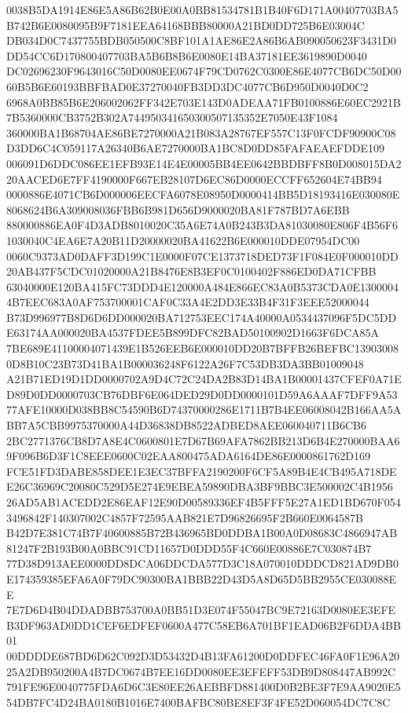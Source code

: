 \documentclass[UTF8,fontset=fandol,zihao=-4,a4paper]{ctexart}
\begin{document}
{{0038B5DA1914E86E5A86B62B0E00A0BB81534781B1B40F6D171A00407703BA5B742B6E0080095B9F7181EEA64168BBB80000A21BD0DD725B6E03004C
DB034D0C7437755BDB050500C8BF101A1AE86E2A86B6AB090050623F3431D0DD54CC6D170800407703BA5B6B8B6E0080E14BA37181EE3619890D0040
DC02696230F9643016C50D0080EE0674F79CD0762C0300E86E4077CB6DC50D0060B5B6E60193BBFBAD0E37270040FB3DD3DC4077CB6D950D0040D0C2
6968A0BB85B6E206002062FF342E703E143D0ADEAA71FB0100886E60EC2921B7B5360000CB3752B302A744950341650300507135352E7050E43F1084
360000BA1B68704AE86BE7270000A21B083A28767EF557C13F0FCDF90900C08D3DD6C4C059117A26340B6AE7270000BA1BC8D0DD85FAFAEAEFDDE109
006091D6DDC086EE1EFB93E14E4E00005BB4EE0642BBDBFF8B0D008015DA220AACED6E7FF4190000F667EB28107D6EC86D0000ECCFF652604E74BB94
0000886E4071CB6D000006EECFA6078E08950D0000414BB5D18193416E030080E8068624B6A309008036FBB6B981D656D9000020BA81F787BD7A6EBB
880000886EA0F4D3ADB8010020C35A6E74A0B243B3DA81030080E806F4B56F61030040C4EA6E7A20B11D20000020BA41622B6E000010DDE07954DC00
0060C9373AD0DAFF3D199C1E0000F07CE1373718DED73F1F084E0F000010DD20AB437F5CDC01020000A21B8476E8B3EF0C0100402F886ED0DA71CFBB
63040000E120BA415FC73DDD4E120000A484E866EC83A0B5373CDA0E13000044B7EEC683A0AF753700001CAF0C33A4E2DD3E33B4F31F3EEE52000044
B73D996977B8D6D6DD000020BA712753EEC174A40000A0534437096F5DC5DDE63174AA000020BA4537FDEE5B899DFC82BAD50100902D1663F6DCA85A
7BE689E41100004071439E1B526EEB6E000010DD20B7BFFB26BEFBC139030080D8B10C23B73D41BA1B000036248F6122A26F7C53DB3DA3BB01009048
A21B71ED19D1DD0000702A9D4C72C24DA2B83D14BA1B00001437CFEF0A71ED89D0DD0000703CB76DBF6E064DED29D0DD0000101D59A6AAAF7DFF9A53
77AFE10000D038BB8C54590B6D74370000286E1711B7B4EE06008042B166AA5ABB7A5CBB9975370000A44D36838DB8522ADBED8AEE060040711B6CB6
2BC2771376CB8D7A8E4C0600801E7D67B69AFA7862BB213D6B4E270000BAA69F096B6D3F1C8EEE0600C02EAA800475ADA6164DE86E0000861762D169
FCE51FD3DABE858DEE1E3EC37BFFA2190200F6CF5A89B4E4CB495A718DEE26C36969C20080C529D5E274E9EBEA59890DBA3BF9BBC3E500002C4B1956
26AD5AB1ACEDD2E86EAF12E90D00589336EF4B5FFF5E27A1ED1BD670F0543496842F140307002C4857F72595AAB821E7D96826695F2B660E0064587B
B42D7E381C74B7F40600885B72B436965BD0DDBA1B00A0D08683C4866947AB81247F2B193B00A0BBC91CD11657D0DDD55F4C660E00886E7C030874B7
77D38D913AEE0000DD8DCA06DDCDA577D3C18A070010DDDCD821AD9DB0E174359385EFA6A0F79DC90300BA1BBB22D43D5A8D65D5BB2955CE030088EE
7E7D6D4B04DDADBB753700A0BB51D3E074F55047BC9E72163D0080EE3EFEB3DF963AD0DD1CEF6EDFEF0600A477C58EB6A701BF1EAD06B2F6DDA4BB01
00DDDDE687BD6D62C092D3D53432D4B13FA61200D0DDFEC46FA0F1E96A2025A2DB950200A4B7DC0674B7EE16DD0080EE3EFEFF53DB9D808447AB992C
791FE96E0040775FDA6D6C3E80EE26AEBBFD881400D0B2BE3F7E9AA9020E554DB7FC4D24BA0180B1016E7400BAFBC80BE8EF3F4FE52D060054DC7C8C
}}
\end{document}
